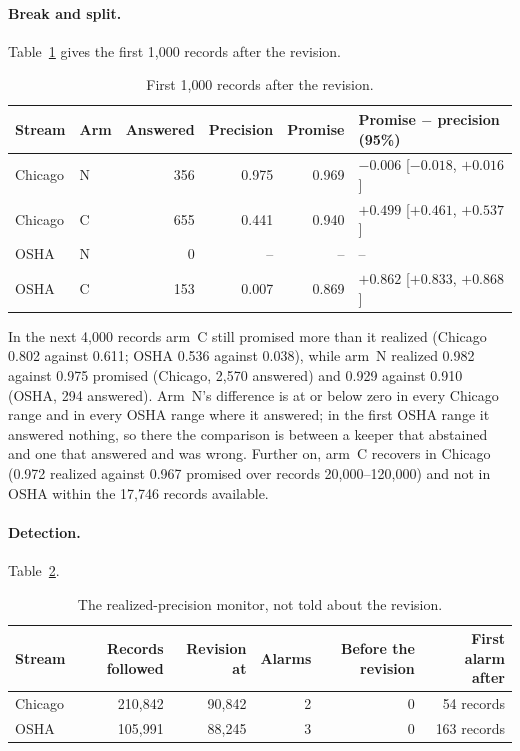 \documentclass[11pt]{article}
\begin{document}
\paragraph{Break and split.} Table~\ref{tab:split} gives the first 1{,}000 records after the revision.

\begin{table}[h]
\centering
\caption{First 1{,}000 records after the revision.}
\label{tab:split}
\begin{tabular}{llrrrl}
\toprule
Stream & Arm & Answered & Precision & Promise & Promise $-$ precision (95\%) \\
\midrule
Chicago & N & 356 & 0.975 & 0.969 & $-0.006$ [$-0.018$, $+0.016$] \\
Chicago & C & 655 & 0.441 & 0.940 & $+0.499$ [$+0.461$, $+0.537$] \\
OSHA & N & 0 & -- & -- & -- \\
OSHA & C & 153 & 0.007 & 0.869 & $+0.862$ [$+0.833$, $+0.868$] \\
\bottomrule
\end{tabular}
\end{table}

In the next 4{,}000 records arm~C still promised more than it realized (Chicago 0.802 against 0.611; OSHA 0.536 against
0.038), while arm~N realized 0.982 against 0.975 promised (Chicago, 2{,}570 answered) and 0.929 against 0.910 (OSHA, 294
answered). Arm~N's difference is at or below zero in every Chicago range and in every OSHA range where it answered; in
the first OSHA range it answered nothing, so there the comparison is between a keeper that abstained and one that
answered and was wrong. Further on, arm~C recovers in Chicago (0.972 realized against 0.967 promised over records
20{,}000--120{,}000) and not in OSHA within the 17{,}746 records available.

\paragraph{Detection.} Table~\ref{tab:watch}.

\begin{table}[h]
\centering
\caption{The realized-precision monitor, not told about the revision.}
\label{tab:watch}
\begin{tabular}{lrrrrr}
\toprule
Stream & Records followed & Revision at & Alarms & Before the revision & First alarm after \\
\midrule
Chicago & 210{,}842 & 90{,}842 & 2 & 0 & 54 records \\
OSHA & 105{,}991 & 88{,}245 & 3 & 0 & 163 records \\
\bottomrule
\end{tabular}
\end{table}
\end{document}
